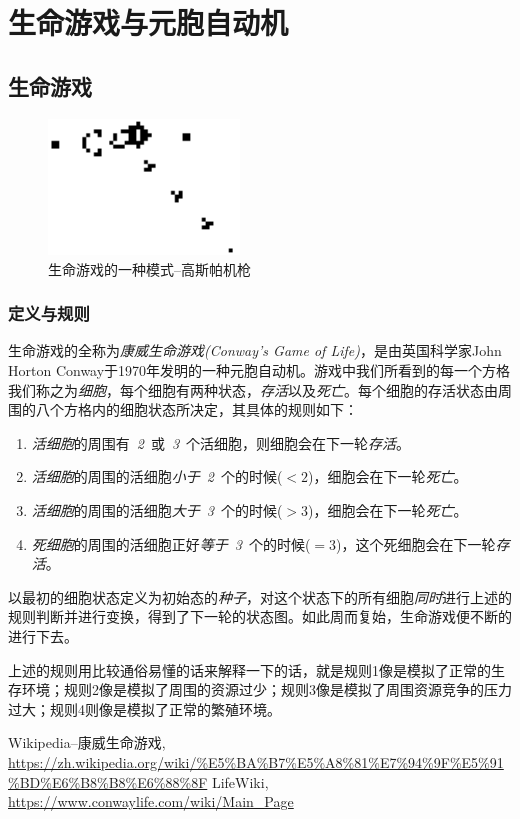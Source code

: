 \section{生命游戏与元胞自动机}

\subsection{生命游戏}

\begin{figure}[htb]
	\centering
	\includegraphics[width=2in]{figure/ConwayGame/Gospers_glider_gun.png}
	\caption{生命游戏的一种模式--高斯帕机枪}\label{fig_4.1}
\end{figure}


\subsubsection{定义与规则}

生命游戏的全称为\emph{康威生命游戏(Conway's Game of Life)}，是由英国科学家John Horton Conway于1970年发明的一种元胞自动机。游戏中我们所看到的每一个方格我们称之为\emph{细胞}，每个细胞有两种状态，\emph{存活}以及\emph{死亡}。每个细胞的存活状态由周围的八个方格内的细胞状态所决定，其具体的规则如下\cite{cgame:1}：

\begin{enumerate}
    \item \emph{活细胞}的周围有~{\color{red}\emph{2}}~或~{\color{red}\emph{3}}~个活细胞，则细胞会在下一轮\emph{存活}。
    \item \emph{活细胞}的周围的活细胞\emph{小于}~{\color{red}\emph{2}}~个的时候($<2$)，细胞会在下一轮\emph{死亡}。
    \item \emph{活细胞}的周围的活细胞\emph{大于}~{\color{red}\emph{3}}~个的时候($>3$)，细胞会在下一轮\emph{死亡}。
    \item \emph{死细胞}的周围的活细胞正好\emph{等于}~{\color{red}\emph{3}}~个的时候($=3$)，这个死细胞会在下一轮\emph{存活}。
\end{enumerate}

以最初的细胞状态定义为初始态的\emph{种子}，对这个状态下的所有细胞\emph{同时}进行上述的规则判断并进行变换，得到了下一轮的状态图。如此周而复始，生命游戏便不断的进行下去。

上述的规则用比较通俗易懂的话来解释一下的话，就是规则1像是模拟了正常的生存环境；规则2像是模拟了周围的资源过少；规则3像是模拟了周围资源竞争的压力过大；规则4则像是模拟了正常的繁殖环境。




\begin{thebibliography}{}
    Wikipedia--康威生命游戏, 
    \url{https://zh.wikipedia.org/wiki/%E5%BA%B7%E5%A8%81%E7%94%9F%E5%91%BD%E6%B8%B8%E6%88%8F}
    LifeWiki, \url{https://www.conwaylife.com/wiki/Main_Page}
\end{thebibliography}

